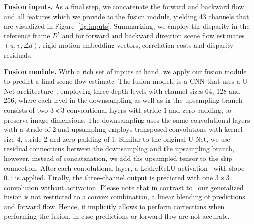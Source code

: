 \documentclass[10pt,twocolumn,letterpaper]{article}
\newcommand*\circled[1]{\tikz[baseline=(char.base)]{\node[shape=circle,draw,inner sep=0.5pt] (char) {#1};}}
\begin{document}
\medskip
\noindent
\circled{6} \textbf{Fusion inputs.}
As a final step, we concatenate the forward and backward flow and all features which we provide to the fusion module, yielding 43 channels that are visualized in Figure~\ref{fig:inputs}.
Summarizing, we employ the disparity in the reference frame $D^t$ and for forward and backward direction scene flow estimates $(u ,v, \Delta d)$, rigid-motion embedding vectors, correlation costs and disparity residuals.

\medskip
\noindent
\circled{7} \textbf{Fusion module.}
With a rich set of inputs at hand, we apply our fusion module to predict a final scene flow estimate.
The fusion module is a CNN that uses a U-Net architecture~\cite{Ronneberger2015_UNet}, employing three depth levels with channel sizes 64, 128 and 256, where each level in the downsampling as well as in the upsampling branch consists of two $3 \times 3$ convolutional layers with stride 1 and zero-padding, to preserve image dimensions.
The downsampling uses the same convolutional layers with a stride of 2 and upsampling employs transposed convolutions with kernel size 4, stride 2 and zero-padding of 1.
Similar to the original U-Net, we use residual connections between the downsampling and the upsampling branch, however, instead of concatenation, we add the upsampled tensor to the skip connection.
After each convolutional layer, a LeakyReLU activation~\cite{Maas2013_leakyrelu} with slope $0.1$ is applied.
Finally, the three-channel output is predicted with one $3 \times 3$ convolution without activation.
Please note that in contrast to~\cite{Schuster2021_DTF} our generalized fusion is not restricted to a convex combination, \ie a linear blending of predictions and forward flow.
Hence, it implicitly allows to perform corrections when performing the fusion, in case predictions or forward flow are not accurate.
\end{document}
